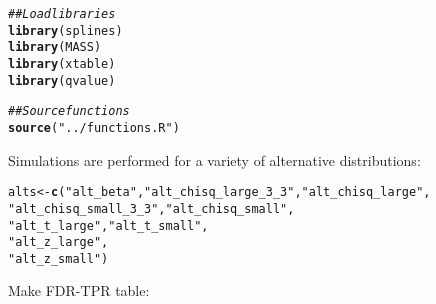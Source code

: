 \documentclass{article}\usepackage[]{graphicx}\usepackage[]{color}
\makeatletter
\newcommand{\hlstr}[1]{\textcolor[rgb]{0.192,0.494,0.8}{#1}}%
\newcommand{\hlcom}[1]{\textcolor[rgb]{0.678,0.584,0.686}{\textit{#1}}}%
\newcommand{\hlstd}[1]{\textcolor[rgb]{0.345,0.345,0.345}{#1}}%
\newcommand{\hlkwb}[1]{\textcolor[rgb]{0.69,0.353,0.396}{#1}}%
\newcommand{\hlkwd}[1]{\textcolor[rgb]{0.737,0.353,0.396}{\textbf{#1}}}%
\newenvironment{kframe}{%
 \def\at@end@of@kframe{}%
 \ifinner\ifhmode%
  \def\at@end@of@kframe{\end{minipage}}%
  \begin{minipage}{\columnwidth}%
 \fi\fi%
 \def\FrameCommand##1{\hskip\@totalleftmargin \hskip-\fboxsep
 \colorbox{shadecolor}{##1}\hskip-\fboxsep
     \hskip-\linewidth \hskip-\@totalleftmargin \hskip\columnwidth}%
 \MakeFramed {\advance\hsize-\width
   \@totalleftmargin\z@ \linewidth\hsize
   \@setminipage}}%
 {\par\unskip\endMakeFramed%
 \at@end@of@kframe}
\newenvironment{knitrout}{}{} %
\makeatother
\begin{document}
\begin{knitrout}
\color{fgcolor}\begin{kframe}
\begin{alltt}
\hlcom{## Load libraries}
\hlkwd{library}\hlstd{(splines)}
\hlkwd{library}\hlstd{(MASS)}
\hlkwd{library}\hlstd{(xtable)}
\hlkwd{library}\hlstd{(qvalue)}

\hlcom{##Source functions}
\hlkwd{source}\hlstd{(}\hlstr{"../functions.R"}\hlstd{)}
\end{alltt}
\end{kframe}
\end{knitrout}

Simulations are performed for a variety of alternative distributions:
\begin{knitrout}
\color{fgcolor}\begin{kframe}
\begin{alltt}
\hlstd{alts} \hlkwb{<-} \hlkwd{c}\hlstd{(}\hlstr{"alt_beta"}\hlstd{,}\hlstr{"alt_chisq_large_3_3"}\hlstd{,}\hlstr{"alt_chisq_large"}\hlstd{,}
          \hlstr{"alt_chisq_small_3_3"}\hlstd{,}\hlstr{"alt_chisq_small"}\hlstd{,}
          \hlstr{"alt_t_large"}\hlstd{,}\hlstr{"alt_t_small"}\hlstd{,}
          \hlstr{"alt_z_large"}\hlstd{,}
          \hlstr{"alt_z_small"}\hlstd{)}
\end{alltt}
\end{kframe}
\end{knitrout}

Make FDR-TPR table:
\end{document}
